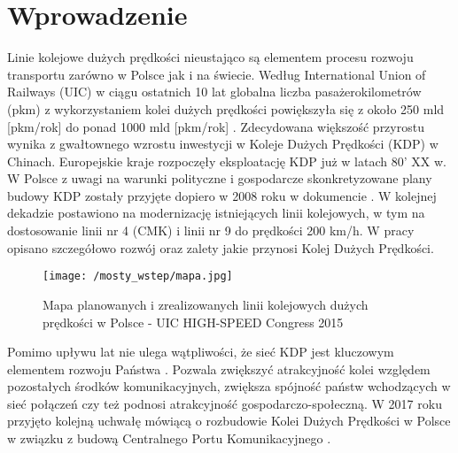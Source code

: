 
\chapter*{Wprowadzenie}

Linie kolejowe dużych prędkości nieustająco są elementem procesu rozwoju transportu zarówno w Polsce jak i na świecie. Według International Union of Railways (UIC) w ciągu ostatnich 10 lat globalna liczba pasażerokilometrów (pkm) z wykorzystaniem kolei dużych prędkości powiększyła się z około 250 mld [pkm/rok] do ponad 1000 mld [pkm/rok] \parencite{UIC2021}. Zdecydowana większość przyrostu wynika z gwałtownego wzrostu inwestycji w Koleje Dużych Prędkości (KDP) w Chinach. Europejskie kraje rozpoczęły eksploatację KDP już w latach 80' XX w. W Polsce z uwagi na warunki polityczne i gospodarcze skonkretyzowane plany budowy KDP zostały przyjęte dopiero w 2008 roku w dokumencie \parencite{UchwaaNr276}. W kolejnej dekadzie postawiono na modernizację istniejących linii kolejowych, w tym na dostosowanie linii nr 4 (CMK) i linii nr 9 do prędkości 200 km/h. W pracy \parencite{Towpik2010} opisano szczegółowo rozwój oraz zalety jakie przynosi Kolej Dużych Prędkości. 

\begin{figure}[hbt!]
	\centering
	\texttt{[image: /mosty\_wstep/mapa.jpg]}
	\captionsetup{justification=centering}
	\caption{Mapa planowanych i zrealizowanych linii kolejowych dużych prędkości w Polsce - UIC HIGH-SPEED Congress 2015 \parencite{UIC2015}}
	\label{fig:LDP_mapa}
\end{figure}

Pomimo upływu lat nie ulega wątpliwości, że sieć KDP jest kluczowym elementem rozwoju Państwa \parencite{Raczynski2010}. Pozwala zwiększyć atrakcyjność kolei względem pozostałych środków komunikacyjnych, zwiększa spójność państw wchodzących w sieć połączeń czy też podnosi atrakcyjność gospodarczo-społeczną. W 2017 roku przyjęto kolejną uchwałę mówiącą o rozbudowie Kolei Dużych Prędkości w Polsce w związku z budową Centralnego Portu Komunikacyjnego \parencite{UchwaaNr173}. 


